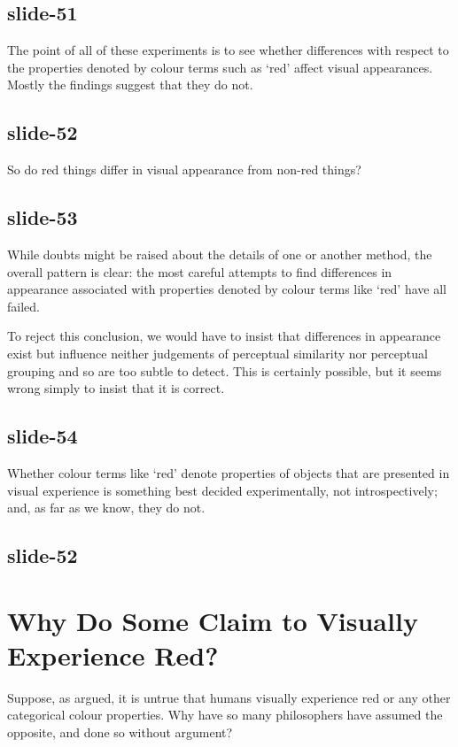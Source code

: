 \documentclass[12pt,\papersize]{extarticle}
\begin{document}
\subsection{slide-51}
The point of all of these experiments is to see whether differences with
respect to the properties denoted by colour terms such as ‘red’ affect visual
appearances.
Mostly the findings suggest that they do not.

\subsection{slide-52}
So do red things differ in visual appearance from non-red things?

\subsection{slide-53}
While doubts might be raised about the details of one or another method, the
overall pattern is clear: the most careful attempts to find differences in
appearance associated with properties denoted by colour terms like ‘red’ have
all failed.

To reject this conclusion, we would have to insist that differences in
appearance exist but influence neither judgements of perceptual similarity nor
perceptual grouping and so are too subtle to detect.
This is certainly possible, but it seems wrong simply to insist that it is correct.

\subsection{slide-54}
Whether colour terms like ‘red’ denote properties of objects that are
presented in visual experience is something best decided experimentally, not
introspectively; and, as far as we know, they do not.

\subsection{slide-52}


\section{Why Do Some Claim to Visually Experience Red?}

Suppose, as argued, it is untrue that humans visually experience red or any
other categorical colour properties.
Why have so many philosophers have assumed the opposite, and done so without argument?
\end{document}
